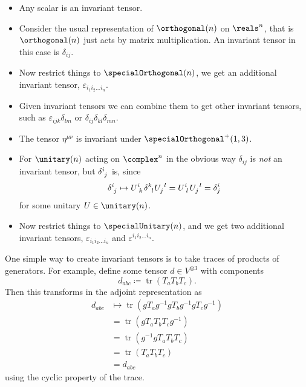 \documentclass[fleqn]{NotesClass}
\DeclareMathOperator{\tr}{tr}
\begin{document}
    \begin{exm}{}{}
        \begin{itemize}
            \item Any scalar is an invariant tensor.
            \item Consider the usual representation of \(\orthogonal(n)\) on \(\reals^n\), that is \(\orthogonal(n)\) just acts by matrix multiplication.
            An invariant tensor in this case is \(\delta_{ij}\).
            \item Now restrict things to \(\specialOrthogonal(n)\), we get an additional invariant tensor, \(\varepsilon_{i_1i_2\dotso i_n}\).
            \item Given invariant tensors we can combine them to get other invariant tensors, such as \(\varepsilon_{ijk}\delta_{lm}\) or \(\delta_{ij}\delta_{kl}\delta_{mn}\).
            \item The tensor \(\eta^{\mu\nu}\) is invariant under \(\specialOrthogonal^+(1, 3)\).
            \item For \(\unitary(n)\) acting on \(\complex^n\) in the obvious way \(\delta_{ij}\) is \emph{not} an invariant tensor, but \(\tensor{\delta}{^i_j}\) is, since
            \begin{equation}
                \tensor{\delta}{^i_j} \mapsto \tensor{U}{^i_k}\tensor{\delta}{^k_l}\tensor{U}{_j^l} = \tensor{U}{^i_l}\tensor{U}{_j^l} = \delta^i_j
            \end{equation}
            for some unitary \(U \in \unitary(n)\).
            \item Now restrict things to \(\specialUnitary(n)\), and we get two additional invariant tensors, \(\varepsilon_{i_1i_2\dotso i_n}\) and \(\varepsilon^{i_1i_2\dotso i_n}\).
        \end{itemize}
    \end{exm}
    
    One simple way to create invariant tensors is to take traces of products of generators.
    For example, define some tensor \(d \in V^{\otimes 3}\) with components
    \begin{equation}
        d_{abc} \coloneqq \tr(T_aT_bT_c).
    \end{equation}
    Then this transforms in the adjoint representation as
    \begin{align}
        d_{abc} &\mapsto \tr(gT_ag^{-1}gT_bg^{-1}gT_cg^{-1})\\
        &= \tr(gT_aT_bT_cg^{-1})\\
        &= \tr(g^{-1}gT_aT_bT_c)\\
        &= \tr(T_aT_bT_c)\\
        &= d_{abc}
    \end{align}
    using the cyclic property of the trace.
    
\end{document}
